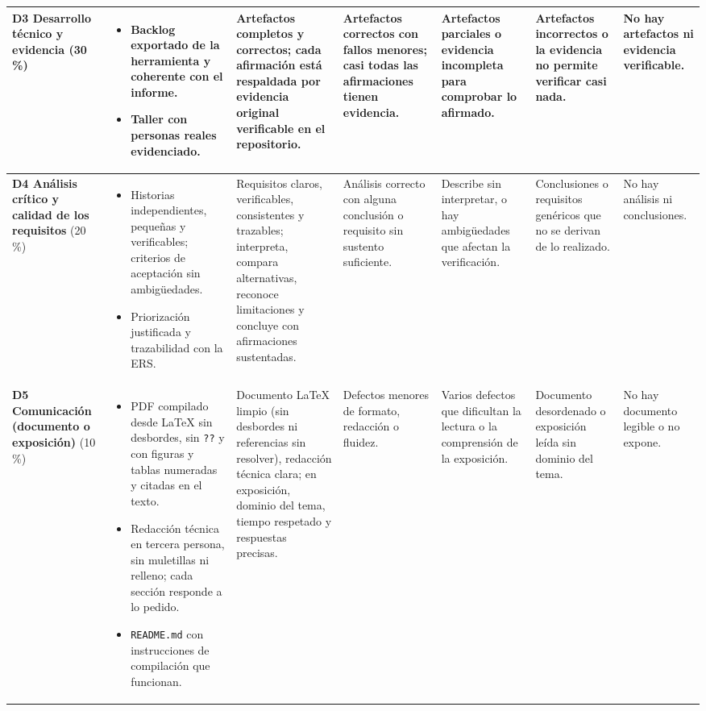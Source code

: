 \documentclass[11pt]{article}
\begin{document}
\begin{landscape}
{\begin{longtable}{|L{2.4cm}|L{5.6cm}|L{3.1cm}|L{2.8cm}|L{2.8cm}|L{2.7cm}|L{2.1cm}|}
	\hline
	\textbf{D3 Desarrollo técnico y evidencia} (30\,\%) & \begin{itemize}[leftmargin=9pt,itemsep=0pt,topsep=0pt,parsep=0pt,partopsep=0pt,after=\vspace{-\baselineskip}]\item Backlog exportado de la herramienta y coherente con el informe.\item Taller con personas reales evidenciado.\end{itemize} & Artefactos completos y correctos; cada afirmación está respaldada por evidencia original verificable en el repositorio. & Artefactos correctos con fallos menores; casi todas las afirmaciones tienen evidencia. & Artefactos parciales o evidencia incompleta para comprobar lo afirmado. & Artefactos incorrectos o la evidencia no permite verificar casi nada. & No hay artefactos ni evidencia verificable.\\
	\hline
	\textbf{D4 Análisis crítico y calidad de los requisitos} (20\,\%) & \begin{itemize}[leftmargin=9pt,itemsep=0pt,topsep=0pt,parsep=0pt,partopsep=0pt,after=\vspace{-\baselineskip}]\item Historias independientes, pequeñas y verificables; criterios de aceptación sin ambigüedades.\item Priorización justificada y trazabilidad con la ERS.\end{itemize} & Requisitos claros, verificables, consistentes y trazables; interpreta, compara alternativas, reconoce limitaciones y concluye con afirmaciones sustentadas. & Análisis correcto con alguna conclusión o requisito sin sustento suficiente. & Describe sin interpretar, o hay ambigüedades que afectan la verificación. & Conclusiones o requisitos genéricos que no se derivan de lo realizado. & No hay análisis ni conclusiones.\\
	\hline
	\textbf{D5 Comunicación (documento o exposición)} (10\,\%) & \begin{itemize}[leftmargin=9pt,itemsep=0pt,topsep=0pt,parsep=0pt,partopsep=0pt,after=\vspace{-\baselineskip}]\item PDF compilado desde \LaTeX{} sin desbordes, sin \texttt{??} y con figuras y tablas numeradas y citadas en el texto.\item Redacción técnica en tercera persona, sin muletillas ni relleno; cada sección responde a lo pedido.\item \texttt{README.md} con instrucciones de compilación que funcionan.\end{itemize} & Documento \LaTeX{} limpio (sin desbordes ni referencias sin resolver), redacción técnica clara; en exposición, dominio del tema, tiempo respetado y respuestas precisas. & Defectos menores de formato, redacción o fluidez. & Varios defectos que dificultan la lectura o la comprensión de la exposición. & Documento desordenado o exposición leída sin dominio del tema. & No hay documento legible o no expone.\\

\end{longtable}}
\end{landscape}
\end{document}

